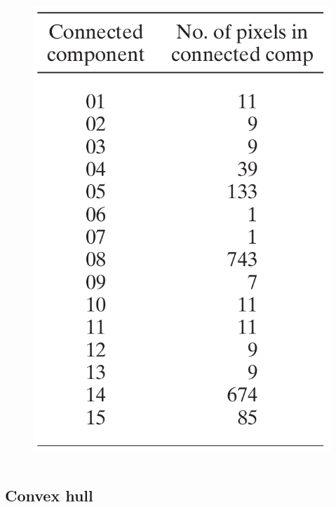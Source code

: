 \begin{frame}
\begin{columns}
\begin{column}{.3\textwidth}
\begin{figure}[!h]
\includegraphics[width=\textwidth]{fig-9-18d.png}
\end{figure}
\end{column}
\end{columns}
\end{frame}

\subsection{Convex hull}

